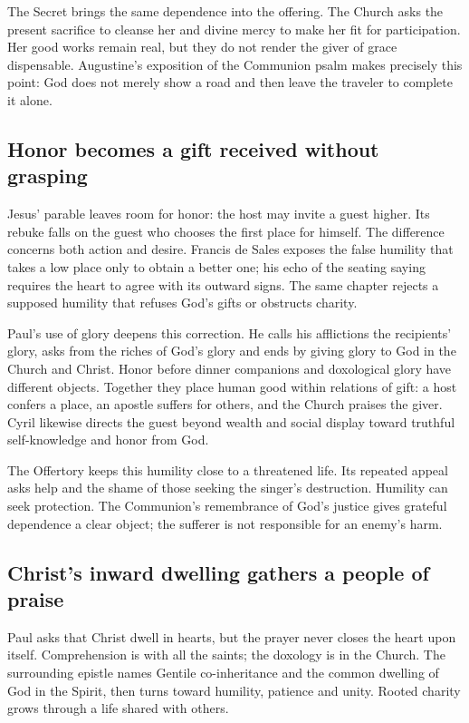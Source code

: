 The Secret brings the same dependence into the offering. The Church asks the present sacrifice to cleanse her and divine mercy to make her fit for participation. Her good works remain real, but they do not render the giver of grace dispensable. Augustine's exposition of the Communion psalm makes precisely this point: God does not merely show a road and then leave the traveler to complete it alone. 

\subsection*{Honor becomes a gift received without grasping}
Jesus' parable leaves room for honor: the host may invite a guest higher. Its rebuke falls on the guest who chooses the first place for himself. The difference concerns both action and desire. Francis de Sales exposes the false humility that takes a low place only to obtain a better one; his echo of the seating saying requires the heart to agree with its outward signs. The same chapter rejects a supposed humility that refuses God's gifts or obstructs charity. 

Paul's use of glory deepens this correction. He calls his afflictions the recipients' glory, asks from the riches of God's glory and ends by giving glory to God in the Church and Christ. Honor before dinner companions and doxological glory have different objects. Together they place human good within relations of gift: a host confers a place, an apostle suffers for others, and the Church praises the giver. Cyril likewise directs the guest beyond wealth and social display toward truthful self-knowledge and honor from God. 

The Offertory keeps this humility close to a threatened life. Its repeated appeal asks help and the shame of those seeking the singer's destruction. Humility can seek protection. The Communion's remembrance of God's justice gives grateful dependence a clear object; the sufferer is not responsible for an enemy's harm. 
\clearpage
\label{triptych:brief-synthesis:end}
\subsection*{Christ's inward dwelling gathers a people of praise}
Paul asks that Christ dwell in hearts, but the prayer never closes the heart upon itself. Comprehension is with all the saints; the doxology is in the Church. The surrounding epistle names Gentile co-inheritance and the common dwelling of God in the Spirit, then turns toward humility, patience and unity. Rooted charity grows through a life shared with others. 

